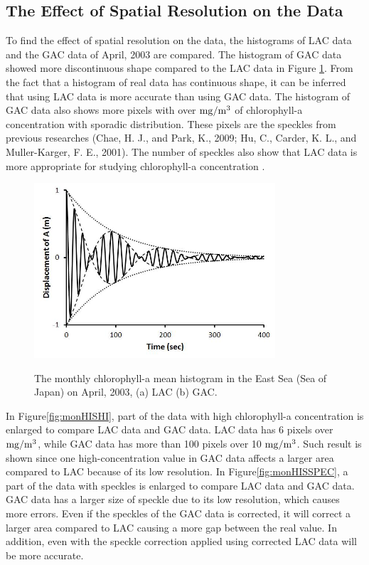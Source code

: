 \newpage
\newpage

\subsection{The Effect of Spatial Resolution on the Data}
 
To find the effect of spatial resolution on the data, the histograms of LAC data and the GAC data of April, 2003 are compared. The histogram of GAC data showed more discontinuous shape compared to the LAC data in Figure \ref{fig:monHIS}. From the fact that a histogram of real data has continuous shape, it can be inferred that using LAC data is more accurate than using GAC data. The histogram of GAC data also shows more pixels with over $\rm mg/m^3$ of chlorophyll-a concentration with sporadic distribution. These pixels are the speckles from previous researches (Chae, H. J., and Park, K., 2009; Hu, C., Carder, K. L., and Muller-Karger, F. E., 2001). The number of speckles also show that LAC data is more appropriate for studying chlorophyll-a concentration \cite{chae2009characteristics,hu2001precise}.
  
\begin{figure}[h]
	\centering
	\includegraphics[width=0.8\textwidth]{../images/monHIS}\\
	\caption{The monthly chlorophyll-a mean histogram in the East Sea (Sea of Japan) on April, 2003, (a) LAC (b) GAC.}
	\label{fig:monHIS}
\end{figure}
 
In Figure\ref{fig:monHISHI}, part of the data with high chlorophyll-a concentration is enlarged to compare LAC data and GAC data. LAC data has 6 pixels over $\rm mg/m^3$, while GAC data has more than 100 pixels over 10 $\rm mg/m^3$. Such result is shown since one high-concentration value in GAC data affects a larger area compared to LAC because of its low resolution.
In Figure\ref{fig:monHISSPEC}, a part of the data with speckles is enlarged to compare LAC data and GAC data. GAC data has a larger size of speckle due to its low resolution, which causes more errors. Even if the speckles of the GAC data is corrected, it will correct a larger area compared to LAC causing a more gap between the real value. In addition, even with the speckle correction applied using corrected LAC data will be more accurate.
    
